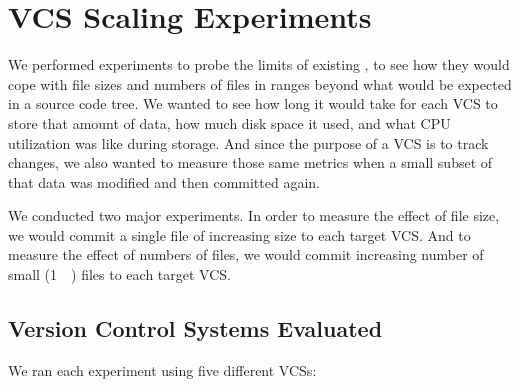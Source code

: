 \chapter{VCS Scaling Experiments}
\label{file-size-exp-desc}
\label{num-files-exp-desc}

We performed experiments to probe the limits of existing , to see
how they would cope with file sizes and numbers of files in ranges beyond what
would be expected in a source code tree. We wanted to see how long it would take
for each \gls{VCS} to store that amount of data, how much disk space it used,
and what CPU utilization was like during storage. And since the purpose of a
\gls{VCS} is to track changes, we also wanted to measure those same metrics when
a small subset of that data was modified and then committed again.

We conducted two major experiments. In order to measure the effect of file size,
we would \gls{commit} a single file of increasing size to each target \gls{VCS}.
And to measure the effect of numbers of files, we would \gls{commit} increasing
number of small (\SI{1}{\kibi\byte}) files to each target \gls{VCS}.



\section{Version Control Systems Evaluated}

We ran each experiment using five different \glspl{VCS}:

